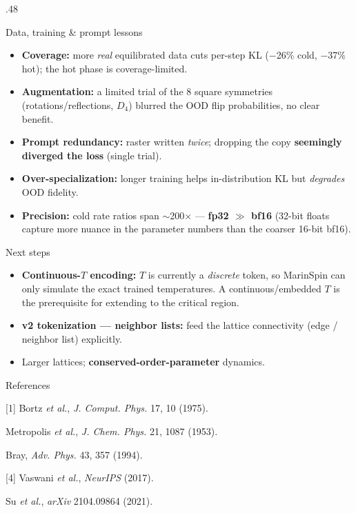 \documentclass[final]{beamer}
\newcommand{\keypt}[1]{\textcolor{oabrown}{\textbf{#1}}}
\let\origtextbf\textbf
\renewcommand{\textbf}[1]{\textcolor{oabrown}{\origtextbf{#1}}}
\begin{document}
\begin{frame}[t]
\begin{columns}[t]
\begin{column}{.48\paperwidth}
  \begin{block}{Data, training \& prompt lessons}
    \begin{itemize}
      \item \textbf{Coverage:} more \emph{real} equilibrated data cuts per-step KL ($-$26\% cold,
            $-$37\% hot); the hot phase is coverage-limited.
      \item \textbf{Augmentation:} a limited trial of the 8 square symmetries (rotations/reflections,
            $D_4$) blurred the OOD flip probabilities, no clear benefit.
      \item \textbf{Prompt redundancy:} raster written \emph{twice}; dropping the copy
            \keypt{seemingly diverged the loss} (single trial).
      \item \textbf{Over-specialization:} longer training helps in-distribution KL but
            \emph{degrades} OOD fidelity.
      \item \textbf{Precision:} cold rate ratios span $\sim$200$\times$ --- \keypt{fp32 $\gg$ bf16}
            (32-bit floats capture more nuance in the parameter numbers than the coarser 16-bit bf16).
    \end{itemize}
  \end{block}

  \begin{block}{Next steps}
    \begin{itemize}
      \item \keypt{Continuous-$T$ encoding:} $T$ is currently a \emph{discrete} token, so MarinSpin
            can only simulate the exact trained temperatures. A continuous/embedded $T$ is the
            prerequisite for extending to the critical region.
      \item \keypt{v2 tokenization --- neighbor lists:} feed the lattice connectivity
            (edge / neighbor list) explicitly.
      \item Larger lattices; \keypt{conserved-order-parameter} dynamics.
    \end{itemize}
  \end{block}

  \begin{block}{References}
    {\footnotesize\setlength{\parskip}{0pt}
    \begin{minipage}[t]{0.49\linewidth}
    [1] Bortz \emph{et al.}, \emph{J. Comput. Phys.} 17, 10 (1975).\par
    [2] Metropolis \emph{et al.}, \emph{J. Chem. Phys.} 21, 1087 (1953).\par
    [3] Bray, \emph{Adv. Phys.} 43, 357 (1994).\par
    \end{minipage}\hfill
    \begin{minipage}[t]{0.49\linewidth}
    [4] Vaswani \emph{et al.}, \emph{NeurIPS} (2017).\par
    [5] Su \emph{et al.}, \emph{arXiv} 2104.09864 (2021).\par
    \end{minipage}
    }
  \end{block}


\end{column}
\end{columns}
\end{frame}
\end{document}
